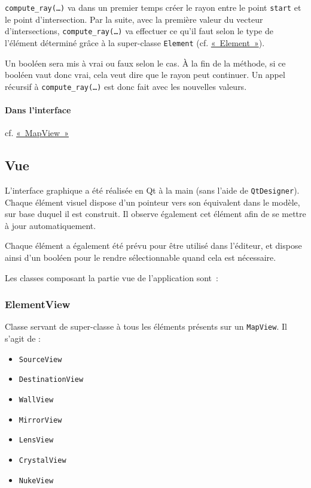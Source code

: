 \documentclass[]{report}
\begin{document}
\texttt{compute\_ray(\dots)} va dans un premier temps créer le rayon entre le point \texttt{start} et le point d'intersection.
Par la suite, avec la première valeur du vecteur d'intersections, 
\texttt{compute\_ray(\dots)} va effectuer ce qu'il faut selon le type de l'élément déterminé 
grâce à la super-classe \texttt{Element} (cf. \hyperref[Element]{«~Element~»}).

Un booléen sera mis à vrai ou faux selon le cas. À la fin de la méthode, si ce booléen vaut donc vrai, cela veut dire
que le rayon peut continuer. Un appel récursif à \texttt{compute\_ray(\dots)} est donc fait avec les nouvelles valeurs. 

\paragraph{Dans l'interface} cf. \hyperref[MapView]{«~MapView~»}    

\newpage
\subsection{Vue}

L'interface graphique a été réalisée en Qt à la main (sans l'aide de \texttt{QtDesigner}).
Chaque élément visuel dispose d’un pointeur vers son
équivalent dans le modèle, sur base duquel il est construit. Il observe également cet élément afin de se mettre
à jour automatiquement.

Chaque élément a également été prévu pour être utilisé dans l'éditeur, et dispose ainsi d’un booléen pour le rendre 
sélectionnable quand cela est nécessaire.

Les classes composant la partie vue de l'application sont~:

\subsubsection{ElementView}

Classe servant de super-classe à tous les éléments présents sur un \texttt{MapView}.
Il s'agit de :

\begin{itemize}
    \item \texttt{SourceView}
    \item \texttt{DestinationView}
    \item \texttt{WallView}
    \item \texttt{MirrorView}
    \item \texttt{LensView}
    \item \texttt{CrystalView}
    \item \texttt{NukeView}
\end{itemize}
\end{document}

